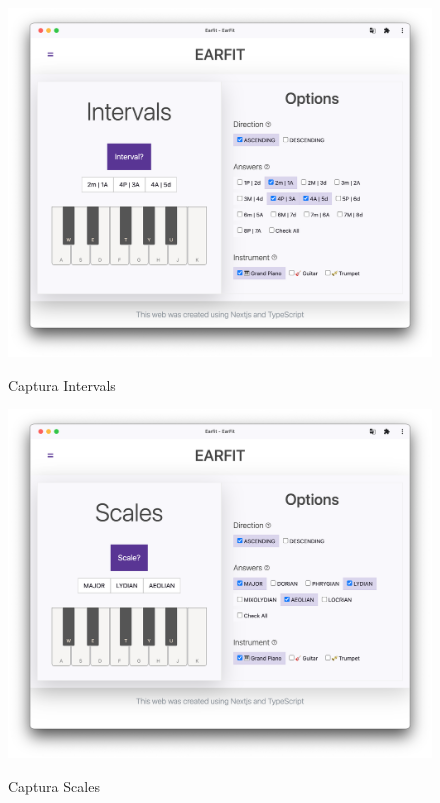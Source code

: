 \documentclass[12pt,twoside,titlepage]{report}
\begin{document}
\begin{figure}[H]
    \centering
    \includegraphics[scale=0.3]{Capturas Earfit/Tablet/Intervals}
    \label{fig:TabletIntervals}
    \caption{Captura Intervals}
\end{figure}

\begin{figure}[H]
    \centering
    \includegraphics[scale=0.3]{Capturas Earfit/Tablet/Scales}
    \label{fig:TabletScales}
    \caption{Captura Scales}
\end{figure}
\end{document}
